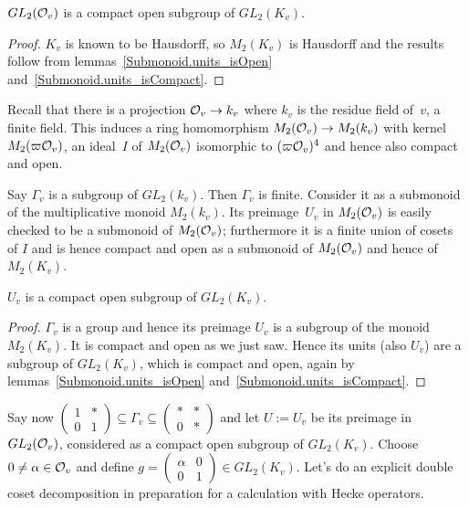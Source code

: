 \begin{lemma} $GL_2(\mathcal{O}_v)$ is a compact open subgroup of $GL_2(K_v)$.
  \label{nolean-compactopen-GL2}
\end{lemma}
\begin{proof}
  $K_v$ is known to be Hausdorff, so $M_2(K_v)$ is Hausdorff and the
  results follow from lemmas~\ref{Submonoid.units_isOpen} and~\ref{Submonoid.units_isCompact}.
\end{proof}

Recall that there is a projection $\mathcal{O}_v\to k_v$ where $k_v$ is the residue
field of~$v$, a finite field. This induces a ring homomorphism $M_2(\mathcal{O}_v)\to M_2(k_v)$
with kernel $M_2(\varpi\mathcal{O}_v)$, an ideal~$I$ of $M_2(\mathcal{O}_v)$ isomorphic to $(\varpi\mathcal{O}_v)^4$
and hence also compact and open.

Say $\Gamma_v$ is a subgroup of $GL_2(k_v)$. Then $\Gamma_v$ is finite. Consider it as a submonoid of
the multiplicative monoid $M_2(k_v)$. Its preimage~$U_v$ in $M_2(\mathcal{O}_v)$
is easily checked to be a submonoid of $M_2(\mathcal{O}_v)$; furthermore it is a finite union of
cosets of $I$ and is hence compact and open as a submonoid of $M_2(\mathcal{O}_v)$ and hence of $M_2(K_v)$.

\begin{lemma}
  \label{nolean-compactopen-U1p} $U_v$ is a compact open subgroup of $GL_2(K_v)$.
\end{lemma}
\begin{proof}
  $\Gamma_v$ is a group and hence its preimage $U_v$ is a subgroup of the monoid
  $M_2(K_v)$. It is compact and open as we just saw. Hence its units (also $U_v$)
  are a subgroup of $GL_2(K_v)$, which is compact and open, again by
  lemmas~\ref{Submonoid.units_isOpen} and~\ref{Submonoid.units_isCompact}.
\end{proof}

Say now $\begin{pmatrix}1&*\\0&1\end{pmatrix}\subseteq\Gamma_v\subseteq\begin{pmatrix}*&*\\0&*\end{pmatrix}$
and let $U:=U_v$ be its preimage in $GL_2(\mathcal{O}_v)$, considered as a compact open subgroup of $GL_2(K_v)$.
Choose $0\not=\alpha\in\mathcal{O}_v$ and define $g=\begin{pmatrix}\alpha&0\\0&1\end{pmatrix}\in GL_2(K_v)$.
Let's do an explicit double coset decomposition in preparation for a calculation with Hecke operators.

